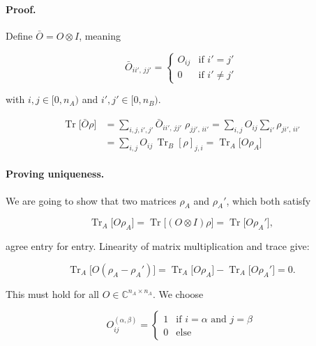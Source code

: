 \paragraph{Proof.} Define $\bar O = O\otimes I$, meaning

\begin{equation}
\bar O_{ii',\,jj'} = \begin{cases} O_{ij} & \text{if } i'=j'\\[2pt] 0 & \text{if } i'\neq j'\end{cases}
\end{equation}

with $i,j\in[0,n_A)$ and $i',j'\in[0,n_B)$.

\begin{align}
\operatorname{Tr}\big[\bar O\rho\big]
&= \sum_{i,j,i',j'}\bar O_{ii',\,jj'}\;\rho_{jj',\,ii'}
= \sum_{i,j}O_{ij}\sum_{i'}\rho_{ji',\,ii'}\\
&= \sum_{i,j}O_{ij}\,\operatorname{Tr}_B[\rho]_{j,i}
= \operatorname{Tr}_A\big[O\rho_A\big]
\end{align}

\paragraph{Proving uniqueness.}
We are going to show that two matrices $\rho_A$ and $\rho_A'$, which
both satisfy

\begin{equation}
\operatorname{Tr}_A\big[O\rho_A\big] = \operatorname{Tr}\big[(O\otimes I)\rho\big] = \operatorname{Tr}\big[O\rho_A'\big],
\end{equation}

agree entry for entry. Linearity of matrix multiplication and trace
give:

\begin{equation}
\operatorname{Tr}_A\big[O(\rho_A-\rho_A')\big] = \operatorname{Tr}_A\big[O\rho_A\big] - \operatorname{Tr}_A\big[O\rho_A'\big] = 0.
\end{equation}

This must hold for all $O\in\mathbb C^{n_A\times n_A}$. We choose

\begin{equation}
O^{(\alpha,\beta)}_{ij} = \begin{cases}1 & \text{if } i=\alpha \text{ and } j=\beta\\ 0 & \text{else}\end{cases}
\end{equation}

